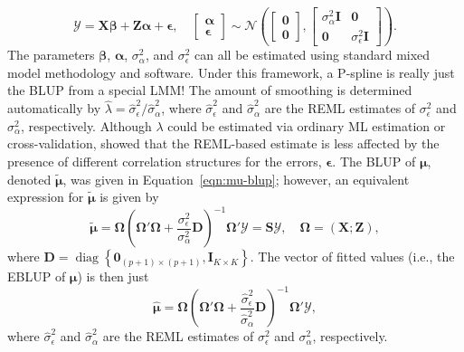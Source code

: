 \documentclass[cmfont,usenames,dvipsnames,leqno]{afit-etd}\usepackage[]{graphicx}\usepackage[]{color}
\newcommand{\bc}[1]{\ensuremath{\bm{\mathcal{#1}}}}
\newcommand{\mc}[1]{\ensuremath{\mathcal{#1}}}
\newcommand{\wh}[1]{\ensuremath{\widehat{#1}}}
\newcommand{\wt}[1]{\ensuremath{\widetilde{#1}}}
\newcommand{\diag}{\operatorname{diag}}
\begin{document}
\begin{equation}
\label{eqn:pspline-lmm}
  \bc{Y} = \bm{X}\bm{\beta} + \bm{Z}\bm{\alpha} + \bm{\epsilon}, \quad 
  \begin{bmatrix} 
    \bm{\alpha} \\
    \bm{\epsilon}
  \end{bmatrix} \sim 
    \mc{N}\left(\begin{bmatrix} 
      \bm{0} \\
      \bm{0}
    \end{bmatrix}, \begin{bmatrix} 
    \sigma_\alpha^2\bm{I} & \bm{0} \\
    \bm{0} & \sigma_\epsilon^2\bm{I}
  \end{bmatrix}\right).
\end{equation}
The parameters $\bm{\beta}$, $\bm{\alpha}$, $\sigma_\alpha^2$, and $\sigma_\epsilon^2$ can all be estimated using standard mixed model methodology and software. Under this framework, a \ac{P-spline} is really just the \ac{BLUP} from a special \ac{LMM}! The amount of smoothing is determined automatically by $\wh{\lambda} = \wh{\sigma}_\epsilon^2/\wh{\sigma}_\alpha^2$, where $\wh{\sigma}_\epsilon^2$ and $\wh{\sigma}_\alpha^2$ are the \ac{REML} estimates of $\sigma_\epsilon^2$ and $\sigma_\alpha^2$, respectively. Although $\lambda$ could be estimated via ordinary \ac{ML} estimation or cross-validation, \citet{krivobokova_note_2007} showed that the \ac{REML}-based estimate is less affected by the presence of different correlation structures for the errors, $\bm{\epsilon}$. The \ac{BLUP} of $\bm{\mu}$, denoted $\wt{\bm{\mu}}$, was given in Equation~\eqref{eqn:mu-blup}; however, an equivalent expression for $\wt{\bm{\mu}}$ is given by
\begin{equation*}
  \wt{\bm{\mu}} = \bm{\Omega}\left( \bm{\Omega}'\bm{\Omega} + \frac{\sigma_\epsilon^2}{\sigma_\alpha^2}\bm{D} \right)^{-1}\bm{\Omega}'\bc{Y} = \bm{S}\bc{Y}, \quad \bm{\Omega} = \left(\bm{X}; \bm{Z}\right),
\end{equation*}
where $\textbf{D} = \diag\left\{\bm{0}_{(p+1) \times (p+1)}, \bm{I}_{K \times K}\right\}$. The vector of fitted values (i.e., the \ac{EBLUP} of $\bm{\mu}$) is then just
\begin{equation*}
  \wh{\bm{\mu}} = \bm{\Omega}\left( \bm{\Omega}'\bm{\Omega} + \frac{\wh{\sigma}_\epsilon^2}{\wh{\sigma}_\alpha^2}\bm{D} \right)^{-1}\bm{\Omega}'\bc{Y},
\end{equation*}
where $\wh{\sigma}_\epsilon^2$ and $\wh{\sigma}_\alpha^2$ are the \ac{REML} estimates of $\sigma_\epsilon^2$ and $\sigma_\alpha^2$, respectively.
\end{document}

